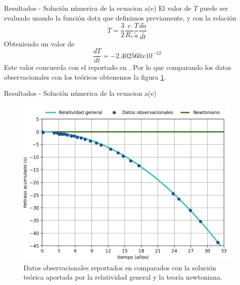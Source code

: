 \begin{frame}{Resultados - Solución númerica de la ecuacion a(e)}
    El valor de $\dot{T}$ puede ser evaluado usando la función \textcolor{def}{dotx} que definimos previamente, y con la relación
    \begin{equation*}
    \dot{T}=\frac{3}{2}\frac{c}{R_\ast}\frac{T}{\tilde{a}}\frac{d\tilde{a}}{d\tilde{t}}
    \end{equation*}
    Obteniendo un valor de 
    \begin{equation*}
        \frac{dT}{dt}=-2.402560x10^{-12}
    \end{equation*}
    Este valor concuerda con el reportado en \cite{Weisberg2010}. Por lo que comparando los datos observacionales con los teóricos obtenemos la figura \ref{fig:exp}.
\end{frame}
\begin{frame}{Resultados - Solución númerica de la ecuacion a(e)}
    \vspace{0.2cm}
    \begin{figure}[H]
        \centering
        \includegraphics[scale=0.5]{images/exp.png}
        \caption{Datos observacionales reportados en \cite{Weisberg2010} comparados con la solución teórica aportada por la relatividad general y la teoría newtoniana.}
        \label{fig:exp}
    \end{figure}
\end{frame}